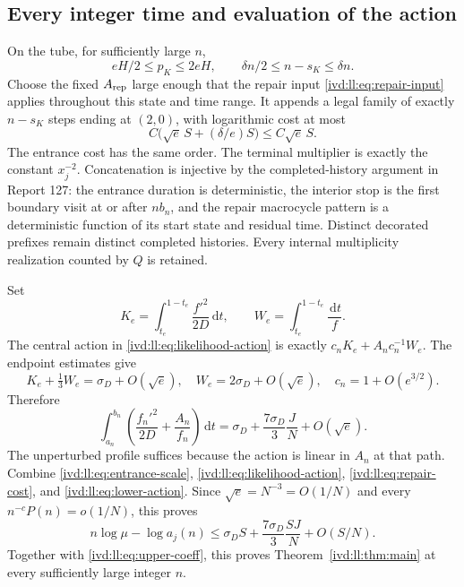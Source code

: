 \documentclass[11pt,letterpaper]{article}
\theoremstyle{remark}\newtheorem{remark}[theorem]{Remark}
\numberwithin{equation}{section}
\newcommand{\dd}{\,\mathrm d}
\begin{document}
\subsection{Every integer time and evaluation of the action}
On the tube, for sufficiently large $n$,
\[
 eH/2\le p_K\le2eH,\qquad
 \delta n/2\le n-s_K\le\delta n.
\]
Choose the fixed $A_{\rm rep}$ large enough that the repair input
\eqref{ivd:ll:eq:repair-input} applies throughout this state and time range.
It appends a legal family of exactly $n-s_K$ steps ending at $(2,0)$,
with logarithmic cost at most
\begin{equation}\label{ivd:ll:eq:repair-cost}
 C\big(\sqrt e\,S+(\delta/e)S\big)\le C\sqrt e\,S.
\end{equation}
The entrance cost has the same order. The terminal multiplier is
exactly the constant $x_j^{-2}$. Concatenation is injective by the
completed-history argument in Report 127: the entrance duration is
deterministic, the interior stop is the first boundary visit at or
after $nb_n$, and the repair macrocycle pattern is a deterministic
function of its start state and residual time. Distinct decorated
prefixes remain distinct completed histories. Every internal
multiplicity realization counted by $Q$ is retained.

Set
\[
 K_e=\int_{t_e}^{1-t_e}\frac{f'^2}{2D}\dd t,
 \qquad W_e=\int_{t_e}^{1-t_e}\frac{\dd t}{f}.
\]
The central action in \eqref{ivd:ll:eq:likelihood-action} is exactly
$c_nK_e+A_nc_n^{-1}W_e$. The endpoint estimates give
\[
 K_e+\tfrac13W_e=\sigma_D+O(\sqrt e),\quad
 W_e=2\sigma_D+O(\sqrt e),\quad c_n=1+O(e^{3/2}).
\]
Therefore
\begin{equation}\label{ivd:ll:eq:lower-action}
 \int_{a_n}^{b_n}\left(\frac{f_n'^2}{2D}+\frac{A_n}{f_n}\right)\dd t
 =\sigma_D+\frac{7\sigma_D}{3}\frac JN+O(\sqrt e).
\end{equation}
The unperturbed profile suffices because the action is linear in
$A_n$ at that path. Combine \eqref{ivd:ll:eq:entrance-scale},
\eqref{ivd:ll:eq:likelihood-action}, \eqref{ivd:ll:eq:repair-cost}, and
\eqref{ivd:ll:eq:lower-action}. Since $\sqrt e=N^{-3}=O(1/N)$ and
every $n^{-c}P(n)=o(1/N)$, this proves
\begin{equation}\label{ivd:ll:eq:lower-coeff}
 n\log\mu-\log a_j(n)
 \le\sigma_D S+\frac{7\sigma_D}{3}\frac{SJ}{N}+O(S/N).
\end{equation}
Together with \eqref{ivd:ll:eq:upper-coeff}, this proves
Theorem~\ref{ivd:ll:thm:main} at every sufficiently large integer $n$.
\end{document}

